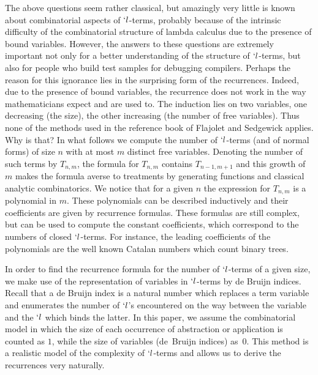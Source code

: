 \documentclass{jfp1}
\begin{document}
The above questions seem rather classical, but amazingly very little is known about
combinatorial aspects of $`l$-terms, probably because of the intrinsic difficulty of
the combinatorial structure of lambda calculus due to the presence of bound
variables.    However, the answers to these questions are extremely
important not only for a better understanding of the structure of $`l$-terms, but also
for people who build test samples for debugging compilers.  Perhaps the
reason for this ignorance lies in the surprising form of the recurrences.  Indeed, due to the
presence of bound variables, the recurrence does not work in the way mathematicians expect
and are used to.  The induction lies on two variables, one decreasing (the size),
the other increasing (the number of free variables). 
Thus none of the methods used in the reference book of
Flajolet and Sedgewick \cite{flajolet08:_analy_combin} applies.  Why is that?  In what
follows we compute the number of $`l$-terms (and of normal forms) of size $n$ with at
most $m$ distinct free variables.  Denoting the number of such terms by $T_{n,m}$, the formula for
$T_{n,m}$ contains $T_{n-1,m+1}$ and this growth of $m$ makes the formula averse to
treatments by generating functions and classical analytic combinatorics.  We notice that
for a given $n$ the expression for $T_{n,m}$ is a polynomial in $m$.  These polynomials can
be described inductively and their coefficients are given by recurrence formulas.  These formulas
are still complex, but can be used to compute the constant coefficients, which correspond
to the numbers of closed $`l$-terms.  For instance, the leading coefficients of the
polynomials are the well known Catalan numbers which count binary trees.

In order to find the recurrence formula for the number of \mbox{$`l$-terms} of a
given size, we make use of the representation of variables in $`l$-terms by de Bruijn
indices.  Recall that a de Bruijn index is a natural number which replaces a term
variable and enumerates the number of $`l$'s encountered on the way between the
variable and the $`l$ which binds the latter.  In this paper, we assume the
combinatorial model in which the size of each occurrence of abstraction or
application is counted as $1$, while the size of variables (de~Bruijn indices)
as~$0$.  This method is a realistic model of the complexity of $`l$-terms and allows
us to derive the recurrences very naturally.  
\end{document}
